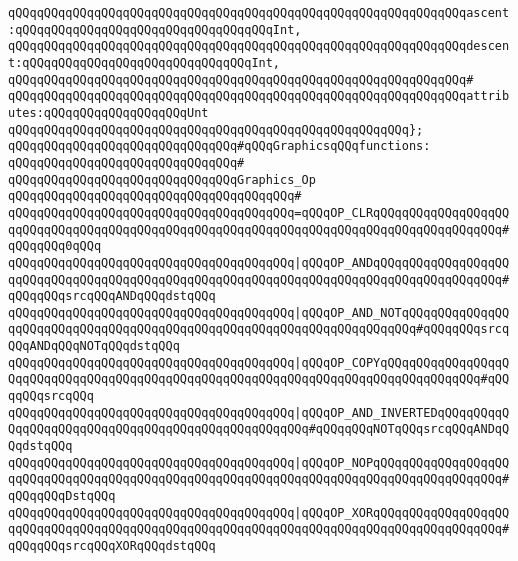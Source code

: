 \verb|qQQqqQQqqQQqqQQqqQQqqQQqqQQqqQQqqQQqqQQqqQQqqQQqqQQqqQQqqQQqqQQqascent:qQQqqQQqqQQqqQQqqQQqqQQqqQQqqQQqqQQqInt,|\newline
\verb|qQQqqQQqqQQqqQQqqQQqqQQqqQQqqQQqqQQqqQQqqQQqqQQqqQQqqQQqqQQqqQQqdescent:qQQqqQQqqQQqqQQqqQQqqQQqqQQqqQQqInt,|\newline
\verb|qQQqqQQqqQQqqQQqqQQqqQQqqQQqqQQqqQQqqQQqqQQqqQQqqQQqqQQqqQQqqQQq#|\newline
\verb|qQQqqQQqqQQqqQQqqQQqqQQqqQQqqQQqqQQqqQQqqQQqqQQqqQQqqQQqqQQqqQQqattributes:qQQqqQQqqQQqqQQqqQQqUnt|\newline
\verb|qQQqqQQqqQQqqQQqqQQqqQQqqQQqqQQqqQQqqQQqqQQqqQQqqQQqqQQq};|\newline
\newline
\verb|qQQqqQQqqQQqqQQqqQQqqQQqqQQqqQQq#qQQqGraphicsqQQqfunctions:|\newline
\verb|qQQqqQQqqQQqqQQqqQQqqQQqqQQqqQQq#|\newline
\verb|qQQqqQQqqQQqqQQqqQQqqQQqqQQqqQQqGraphics_Op|\newline
\verb|qQQqqQQqqQQqqQQqqQQqqQQqqQQqqQQqqQQqqQQq#|\newline
\verb|qQQqqQQqqQQqqQQqqQQqqQQqqQQqqQQqqQQqqQQq=qQQqOP_CLRqQQqqQQqqQQqqQQqqQQqqQQqqQQqqQQqqQQqqQQqqQQqqQQqqQQqqQQqqQQqqQQqqQQqqQQqqQQqqQQqqQQqqQQq#qQQqqQQq0qQQq|\newline
\verb|qQQqqQQqqQQqqQQqqQQqqQQqqQQqqQQqqQQqqQQq|\verb#|qQQqOP_ANDqQQqqQQqqQQqqQQqqQQqqQQqqQQqqQQqqQQqqQQqqQQqqQQqqQQqqQQqqQQqqQQqqQQqqQQqqQQqqQQqqQQqqQQq#\verb|#qQQqqQQqsrcqQQqANDqQQqdstqQQq|\newline
\verb|qQQqqQQqqQQqqQQqqQQqqQQqqQQqqQQqqQQqqQQq|\verb#|qQQqOP_AND_NOTqQQqqQQqqQQqqQQqqQQqqQQqqQQqqQQqqQQqqQQqqQQqqQQqqQQqqQQqqQQqqQQqqQQqqQQq#\verb|#qQQqqQQqsrcqQQqANDqQQqNOTqQQqdstqQQq|\newline
\verb|qQQqqQQqqQQqqQQqqQQqqQQqqQQqqQQqqQQqqQQq|\verb#|qQQqOP_COPYqQQqqQQqqQQqqQQqqQQqqQQqqQQqqQQqqQQqqQQqqQQqqQQqqQQqqQQqqQQqqQQqqQQqqQQqqQQqqQQqqQQq#\verb|#qQQqqQQqsrcqQQq|\newline
\verb|qQQqqQQqqQQqqQQqqQQqqQQqqQQqqQQqqQQqqQQq|\verb#|qQQqOP_AND_INVERTEDqQQqqQQqqQQqqQQqqQQqqQQqqQQqqQQqqQQqqQQqqQQqqQQqqQQq#\verb|#qQQqqQQqNOTqQQqsrcqQQqANDqQQqdstqQQq|\newline
\verb|qQQqqQQqqQQqqQQqqQQqqQQqqQQqqQQqqQQqqQQq|\verb#|qQQqOP_NOPqQQqqQQqqQQqqQQqqQQqqQQqqQQqqQQqqQQqqQQqqQQqqQQqqQQqqQQqqQQqqQQqqQQqqQQqqQQqqQQqqQQqqQQq#\verb|#qQQqqQQqDstqQQq|\newline
\verb|qQQqqQQqqQQqqQQqqQQqqQQqqQQqqQQqqQQqqQQq|\verb#|qQQqOP_XORqQQqqQQqqQQqqQQqqQQqqQQqqQQqqQQqqQQqqQQqqQQqqQQqqQQqqQQqqQQqqQQqqQQqqQQqqQQqqQQqqQQqqQQq#\verb|#qQQqqQQqsrcqQQqXORqQQqdstqQQq|\newline
